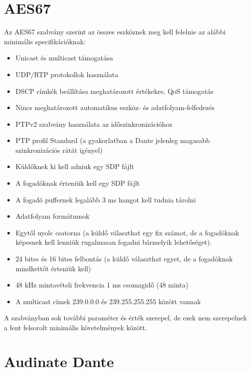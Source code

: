 \section{AES67~\cite{AHNERT2023}}
Az AES67 szabvány szerint az összes eszköznek meg kell felelnie az
alábbi minimális specifikációknak: 
\begin{itemize}
	\item Unicast és multicast támogatása
	\item UDP/RTP protokollok használata
	\item DSCP címkék beállítása meghatározott értékekre, QoS támogatás 
	\item Nincs meghatározott automatikus eszköz- és adatfolyam-felfedezés 
	\item PTPv2 szabvány használata az időszinkronizációhoz
	\item PTP profil Standard (a gyakorlatban a Dante jelenleg magasabb szinkronizációs rátát igényel)
	\item Küldőknek ki kell adniuk egy SDP fájlt
	\item A fogadóknak érteniük kell egy SDP fájlt
	\item A fogadó puffernek legalább 3 ms hangot kell tudnia tárolni
	\item Adatfolyam formátumok
	\item Egytől nyolc csatorna (a küldő választhat egy fix számot, de a fogadóknak képesnek kell lenniük rugalmasan fogadni bármelyik lehetőséget).
	\item 24 bites és 16 bites felbontás (a küldő választhat egyet, de a fogadóknak mindkettőt érteniük kell) 
	\item 48 kHz mintavételi frekvencia 1 ms csomagidő (48 minta)
	\item A multicast címek 239.0.0.0 és 239.255.255.255 között vannak 
\end{itemize}
A szabványban sok további paraméter és érték szerepel, de ezek nem szerepelnek a
fent felsorolt minimális követelmények között.
\section{Audinate Dante~\cite{AHNERT2023}}
